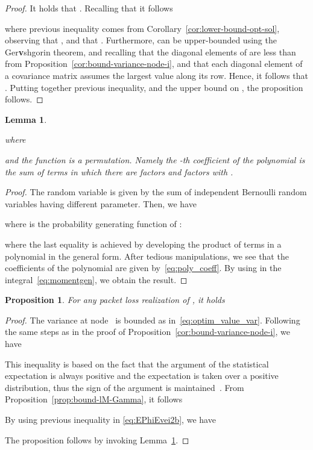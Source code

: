 \documentclass[a4paper,notitlepage,onecolumn]{article}
\def\v{{\bf v}}
\newtheorem{lemma}[theorem]{Lemma}
\newtheorem{proposition}[theorem]{Proposition}
\numberwithin{equation}{section}
\begin{document}
\begin{proof}
It holds that .
Recalling that  it follows
 
where previous inequality comes from Corollary~\ref{cor:lower-bound-opt-sol}, observing that , and that . Furthermore,  can be upper-bounded using the Ger\v{s}hgorin theorem, and recalling that the diagonal elements of  are less than  from Proposition~\ref{cor:bound-variance-node-i}, and that each diagonal element of a covariance matrix assumes the largest value along its row. Hence, it follows that .
Putting together previous inequality, and the upper bound on , the proposition follows.

\end{proof}
\begin{lemma} \label{lemma:boundexpt}

where

and the function  is a permutation.
Namely the -th coefficient of the polynomial is the sum of
 terms in which there are 
factors  and  factors 
with .
\end{lemma}
\begin{proof}
The random variable  is given by the
sum of  independent Bernoulli random
variables having different parameter. Then, we have~\cite{Chao72}

where  is the probability generating function of :

where the last equality is achieved by developing the product of
terms  in a polynomial in the general form. After
tedious manipulations, we see that the coefficients of the
polynomial are given by~\eqref{eq:poly_coeff}.
By using  in the integral~\eqref{eq:momentgen}, we obtain
the result.
\end{proof}
\begin{proposition}
For any packet loss realization  of ,
it holds

\end{proposition}
\begin{proof}
    The variance at node~ is bounded as in~\eqref{eq:optim_value_var}. Following the same steps as in the proof of
    Proposition~\ref{cor:bound-variance-node-i}, we have
    
    This inequality is based on the fact that the argument of the statistical expectation is always positive and the expectation is taken over a positive distribution, thus the sign of the argument is maintained~\cite[pag.392]{Horn85}.
    From Proposition~\ref{prop:bound-lM-Gamma}, it
    follows
    
    By using previous inequality in \eqref{eq:EPhiEvei2b}, we have
    
    The proposition follows by invoking Lemma~\ref{lemma:boundexpt}.
\end{proof}
\end{document}
